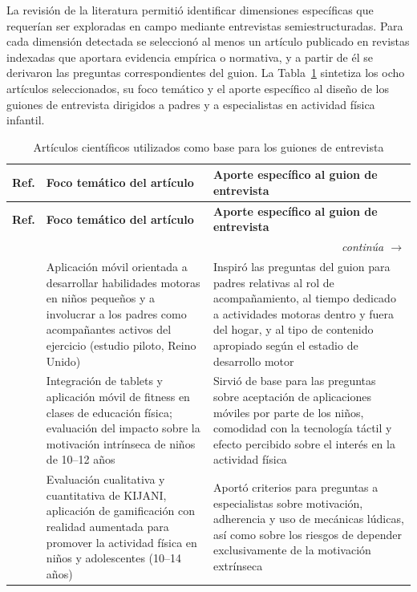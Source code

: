 				La revisión de la literatura permitió identificar dimensiones específicas que requerían ser exploradas en campo mediante entrevistas semiestructuradas. Para cada dimensión detectada se seleccionó al menos un artículo publicado en revistas indexadas que aportara evidencia empírica o normativa, y a partir de él se derivaron las preguntas correspondientes del guion. La Tabla~\ref{tab:articulos_entrevista} sintetiza los ocho artículos seleccionados, su foco temático y el aporte específico al diseño de los guiones de entrevista dirigidos a padres y a especialistas en actividad física infantil.
				
				\begingroup
				\setlength{\LTpre}{6pt}\setlength{\LTpost}{2pt}
				\renewcommand{\arraystretch}{1.15}
				\small
				\begin{longtable}{p{0.75cm}p{6.45cm}p{6.75cm}}
					\caption{Artículos científicos utilizados como base para los guiones de entrevista}\label{tab:articulos_entrevista}\\
					\hline
					\textbf{Ref.} & \textbf{Foco temático del artículo} & \textbf{Aporte específico al guion de entrevista}\\
					\hline
					\endfirsthead
					\hline
					\textbf{Ref.} & \textbf{Foco temático del artículo} & \textbf{Aporte específico al guion de entrevista}\\
					\hline
					\endhead
					\hline\multicolumn{3}{r}{\footnotesize\itshape continúa $\rightarrow$}\\
					\endfoot
					\hline
					\endlastfoot
					\cite{Zhang2024} & Aplicación móvil orientada a desarrollar habilidades motoras en niños pequeños y a involucrar a los padres como acompañantes activos del ejercicio (estudio piloto, Reino Unido) & Inspiró las preguntas del guion para padres relativas al rol de acompañamiento, al tiempo dedicado a actividades motoras dentro y fuera del hogar, y al tipo de contenido apropiado según el estadio de desarrollo motor\\
					\cite{Papastergiou2021} & Integración de tablets y aplicación móvil de fitness en clases de educación física; evaluación del impacto sobre la motivación intrínseca de niños de 10--12 años & Sirvió de base para las preguntas sobre aceptación de aplicaciones móviles por parte de los niños, comodidad con la tecnología táctil y efecto percibido sobre el interés en la actividad física\\
					\cite{Willinger2024} & Evaluación cualitativa y cuantitativa de KIJANI, aplicación de gamificación con realidad aumentada para promover la actividad física en niños y adolescentes (10--14 años) & Aportó criterios para preguntas a especialistas sobre motivación, adherencia y uso de mecánicas lúdicas, así como sobre los riesgos de depender exclusivamente de la motivación extrínseca\\

\end{longtable}
